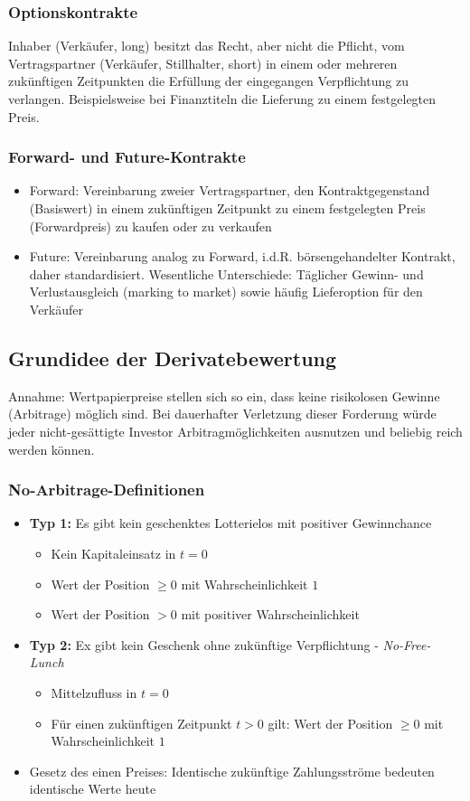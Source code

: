 \subsubsection{Optionskontrakte}
Inhaber (Verkäufer, long) besitzt das Recht, aber nicht die Pflicht, vom Vertragspartner (Verkäufer, Stillhalter, short) in einem oder mehreren zukünftigen Zeitpunkten die Erfüllung der eingegangen Verpflichtung zu verlangen. Beispielsweise bei Finanztiteln die Lieferung zu einem festgelegten Preis.

\subsubsection{Forward- und Future-Kontrakte}
\begin{itemize}
	\item Forward: Vereinbarung zweier Vertragspartner, den Kontraktgegenstand (Basiswert) in einem zukünftigen Zeitpunkt zu einem festgelegten Preis (Forwardpreis) zu kaufen oder zu verkaufen
	\item Future: Vereinbarung analog zu Forward, i.d.R. börsengehandelter Kontrakt, daher standardisiert. Wesentliche Unterschiede: Täglicher Gewinn- und Verlustausgleich (marking to market) sowie häufig Lieferoption für den Verkäufer
\end{itemize}


\subsection{Grundidee der Derivatebewertung}
Annahme: Wertpapierpreise stellen sich so ein, dass keine risikolosen Gewinne (Arbitrage) möglich sind. Bei dauerhafter Verletzung dieser Forderung würde jeder nicht-gesättigte Investor Arbitragmöglichkeiten ausnutzen und beliebig reich werden können.

\subsubsection{No-Arbitrage-Definitionen}
\begin{itemize}
	\item \textbf{Typ 1:} Es gibt kein geschenktes Lotterielos mit positiver Gewinnchance
	\begin{itemize}
		\item Kein Kapitaleinsatz in \(t=0\)
		\item Wert der Position \(\ge 0\) mit Wahrscheinlichkeit \(1\)
		\item Wert der Position \(> 0\) mit positiver Wahrscheinlichkeit
	\end{itemize}
	\item \textbf{Typ 2:} Ex gibt kein Geschenk ohne zukünftige Verpflichtung - \textit{No-Free-Lunch}
	\begin{itemize}
		\item Mittelzufluss in \(t=0\)
		\item Für einen zukünftigen Zeitpunkt \(t>0\) gilt: Wert der Position \(\ge 0\) mit Wahrscheinlichkeit \(1\)
	\end{itemize}
	\item Gesetz des einen Preises: Identische zukünftige Zahlungsströme bedeuten identische Werte heute
\end{itemize}

